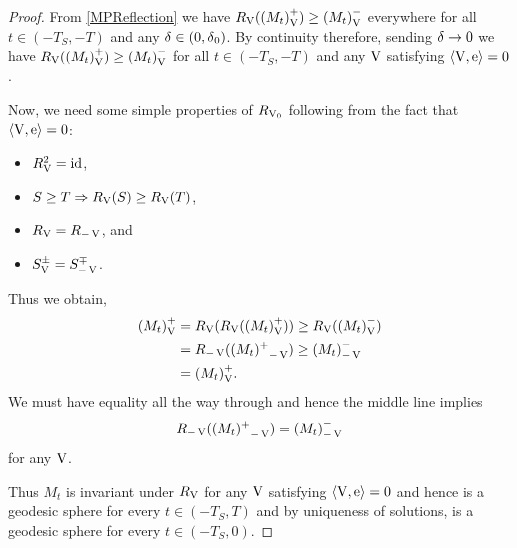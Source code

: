 \documentclass{amsart}
\begin{document}
\begin{proof}
From \cref{MPReflection} we have \(\reflectionmap(\reflectionset{(M_t)}^+) \geq \reflectionset{(M_t)}^-\) everywhere for all \(t \in (-T_S, -T)\) and any \(\reflectionangle \in (0,\reflectionangle_0)\). By continuity therefore, sending \(\reflectionangle \to 0\) we have \(\reflectionmap(\reflectionset{(M_t)}^+) \geq \reflectionset{(M_t)}^-\) for all \(t \in (-T_S, -T)\)  and any \(\reflectionvector\) satisfying \(\ip{\reflectionvector}{\vertvec} = 0\).

Now, we need some simple properties of $\reflectionmap[\reflectionvector_0]$ following from the fact that $\ip{\reflectionvector}{\vertvec} = 0$:
\begin{itemize}
\item $\reflectionmap^2 = \id$,
\item $S \geq T \Rightarrow \reflectionmap(S) \geq  \reflectionmap(T)$,
\item $\reflectionmap = \reflectionmap[-\reflectionvector]$, and
\item $\reflectionset{S}^{\pm} = \reflectionset[-\reflectionvector]{S}^{\mp}$.
\end{itemize}
Thus we obtain,
\begin{align*}
\reflectionset{(M_t)}^+ &= \reflectionmap(\reflectionmap(\reflectionset{(M_t)}^+)) \geq \reflectionmap(\reflectionset{(M_t)}^-) \\
&= \reflectionmap[-\reflectionvector](\reflectionset[-\reflectionvector]{(M_t)^+}) \geq \reflectionset[-\reflectionvector]{(M_t)}^-\\
&= \reflectionset{(M_t)}^+.
\end{align*}
We must have equality all the way through and hence the middle line implies
\[
\reflectionmap[-\reflectionvector](\reflectionset[-\reflectionvector]{(M_t)^+}) = \reflectionset[-\reflectionvector]{(M_t)}^-
\]
for any $\reflectionvector$.

Thus \(M_t\) is invariant under \(\reflectionmap\) for any \(\reflectionvector\) satisfying \(\ip{\reflectionvector}{\vertvec} = 0\) and hence is a geodesic sphere for every \(t \in (-T_S, T)\) and by uniqueness of solutions, is a geodesic sphere for every \(t \in (-T_S, 0)\).
\end{proof}



\end{document}
